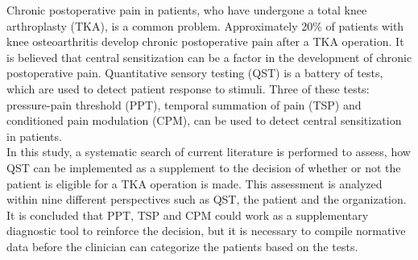 Chronic postoperative pain in patients, who have undergone a total knee arthroplasty (TKA), is a common problem. Approximately 20\% of patients with knee osteoarthritis develop chronic postoperative pain after a TKA operation. It is believed that central sensitization can be a factor in the development of chronic postoperative pain. Quantitative sensory testing (QST) is a battery of tests, which are used to detect patient response to stimuli. Three of these tests: pressure-pain threshold (PPT), temporal summation of pain (TSP) and conditioned pain modulation (CPM), can be used to detect central sensitization in patients.\\
In this study, a systematic search of current literature is performed to assess, how QST can be implemented as a supplement to the decision of whether or not the patient is eligible for a TKA operation is made. This assessment is analyzed within nine different perspectives such as QST, the patient and the organization. \\
It is concluded that PPT, TSP and CPM could work as a supplementary diagnostic tool to reinforce the decision, but it is necessary to compile normative data before the clinician can categorize the patients based on the tests.        

